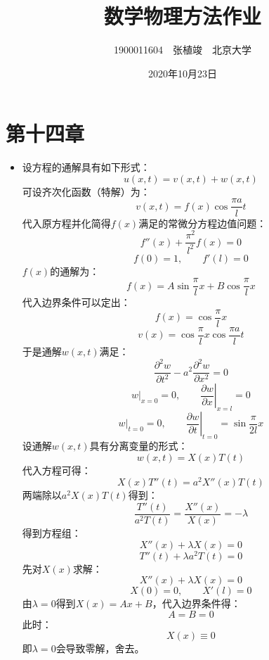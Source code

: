 \documentclass[fontset=windows]{ctexart}
\begin{document}
\title{\textbf{数学物理方法作业}}
\author{1900011604\ \ 张植竣\ \ 北京大学}
\date{2020年10月23日}

\maketitle

\section*{第十四章}

\begin{itemize}

    \item[9.]
    设方程的通解具有如下形式：
    \[
    u(x,t) = v(x,t) + w(x,t)
    \]
    可设齐次化函数（特解）为：
    \[
    v(x,t) = f(x)\cos\frac{\pi a}{l}t
    \]
    代入原方程并化简得$f(x)$满足的常微分方程边值问题：
    \[
    f''(x) + \frac{\pi^2}{l^2}f(x) = 0
    \]
    \[
    f(0) = 1,\qquad
    f'(l) = 0
    \]
    $f(x)$的通解为：
    \[
    f(x) = A\sin\frac{\pi}{l}x + B\cos\frac{\pi}{l}x
    \]
    代入边界条件可以定出：
    \[
    f(x) = \cos\frac{\pi}{l}x
    \]
    \[
    v(x) = \cos\frac{\pi}{l}x\cos\frac{\pi a}{l}t
    \]
    于是通解$w(x,t)$满足：
    \[
    \frac{\partial^2 w}{\partial t^2} - a^2\frac{\partial^2 w}{\partial x^2} = 0
    \]
    \[
    \left.w\right|_{x=0} = 0,\qquad
    \left.\frac{\partial w}{\partial x}\right|_{x=l} = 0
    \]
    \[
    \left.w\right|_{t=0} = 0,\qquad
    \left.\frac{\partial w}{\partial t}\right|_{t=0} = \sin\frac{\pi}{2l}x
    \]
    设通解$w(x,t)$具有分离变量的形式：
    \[
    w(x,t) = X(x)T(t)
    \]
    代入方程可得：
    \[
    X(x)T''(t) = a^2X''(x)T(t)
    \]
    两端除以$a^2X(x)T(t)$得到：
    \[
    \frac{T''(t)}{a^2T(t)} = \frac{X''(x)}{X(x)} = -\lambda
    \]
    得到方程组：
    \[
    X''(x) + \lambda X(x) = 0
    \]
    \[
    T''(t) + \lambda a^2T(t) = 0
    \]
    先对$X(x)$求解：
    \[
    X''(x) + \lambda X(x) = 0
    \]
    \[
    X(0) = 0,\qquad
    X'(l) = 0
    \]
    由$\lambda = 0$得到$X(x) = Ax + B$，代入边界条件得：
    \[
    A = B = 0
    \]
    此时：
    \[
    X(x) \equiv 0
    \]
    即$\lambda = 0$会导致零解，舍去。


\end{itemize}
\end{document}
